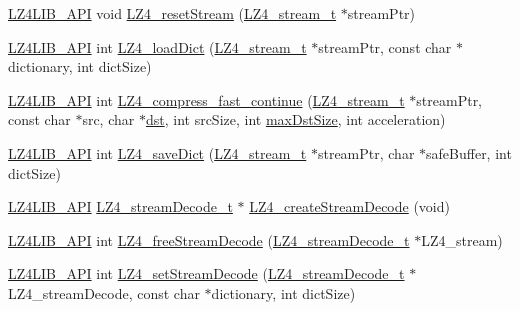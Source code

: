 \begin{DoxyCompactItemize}
\item 
\hyperlink{compat-lz4_8h_a00a61e1435005f8a621edf4bbe0ef844}{L\+Z4\+L\+I\+B\+\_\+\+A\+P\+I} void \hyperlink{compat-lz4_8h_ac8d5c49bc84243e6b69df1ecc25d2425}{L\+Z4\+\_\+reset\+Stream} (\hyperlink{compat-lz4_8h_a4fb9ac4ce6d5e25edc9188f9d6633498}{L\+Z4\+\_\+stream\+\_\+t} $\ast$stream\+Ptr)
\item 
\hyperlink{compat-lz4_8h_a00a61e1435005f8a621edf4bbe0ef844}{L\+Z4\+L\+I\+B\+\_\+\+A\+P\+I} int \hyperlink{compat-lz4_8h_ac14454c14304d2df9bfeaa81216053c1}{L\+Z4\+\_\+load\+Dict} (\hyperlink{compat-lz4_8h_a4fb9ac4ce6d5e25edc9188f9d6633498}{L\+Z4\+\_\+stream\+\_\+t} $\ast$stream\+Ptr, const char $\ast$dictionary, int dict\+Size)
\item 
\hyperlink{compat-lz4_8h_a00a61e1435005f8a621edf4bbe0ef844}{L\+Z4\+L\+I\+B\+\_\+\+A\+P\+I} int \hyperlink{compat-lz4_8h_a7c280948702564f0620262a8eb0b6436}{L\+Z4\+\_\+compress\+\_\+fast\+\_\+continue} (\hyperlink{compat-lz4_8h_a4fb9ac4ce6d5e25edc9188f9d6633498}{L\+Z4\+\_\+stream\+\_\+t} $\ast$stream\+Ptr, const char $\ast$src, char $\ast$\hyperlink{compat-lz4_8h_a961c13eb7fcda15b167b953cac1ab3ec}{dst}, int src\+Size, int \hyperlink{compat-lz4_8h_a6c2299958529e6037c34f9b36f25f4d0}{max\+Dst\+Size}, int acceleration)
\item 
\hyperlink{compat-lz4_8h_a00a61e1435005f8a621edf4bbe0ef844}{L\+Z4\+L\+I\+B\+\_\+\+A\+P\+I} int \hyperlink{compat-lz4_8h_aee9e5bb8a837d840e120f666ed07c09b}{L\+Z4\+\_\+save\+Dict} (\hyperlink{compat-lz4_8h_a4fb9ac4ce6d5e25edc9188f9d6633498}{L\+Z4\+\_\+stream\+\_\+t} $\ast$stream\+Ptr, char $\ast$safe\+Buffer, int dict\+Size)
\item 
\hyperlink{compat-lz4_8h_a00a61e1435005f8a621edf4bbe0ef844}{L\+Z4\+L\+I\+B\+\_\+\+A\+P\+I} \hyperlink{compat-lz4_8h_a76a1eaa4729efddb43040217daad4d4e}{L\+Z4\+\_\+stream\+Decode\+\_\+t} $\ast$ \hyperlink{compat-lz4_8h_a5c6dfdf3179635d8fa92c7cc8d3532a1}{L\+Z4\+\_\+create\+Stream\+Decode} (void)
\item 
\hyperlink{compat-lz4_8h_a00a61e1435005f8a621edf4bbe0ef844}{L\+Z4\+L\+I\+B\+\_\+\+A\+P\+I} int \hyperlink{compat-lz4_8h_a37c487a088c1be5aa3924f51bb1529ab}{L\+Z4\+\_\+free\+Stream\+Decode} (\hyperlink{compat-lz4_8h_a76a1eaa4729efddb43040217daad4d4e}{L\+Z4\+\_\+stream\+Decode\+\_\+t} $\ast$L\+Z4\+\_\+stream)
\item 
\hyperlink{compat-lz4_8h_a00a61e1435005f8a621edf4bbe0ef844}{L\+Z4\+L\+I\+B\+\_\+\+A\+P\+I} int \hyperlink{compat-lz4_8h_a81965fd474a946db05698f9aff385603}{L\+Z4\+\_\+set\+Stream\+Decode} (\hyperlink{compat-lz4_8h_a76a1eaa4729efddb43040217daad4d4e}{L\+Z4\+\_\+stream\+Decode\+\_\+t} $\ast$L\+Z4\+\_\+stream\+Decode, const char $\ast$dictionary, int dict\+Size)

\end{DoxyCompactItemize}
